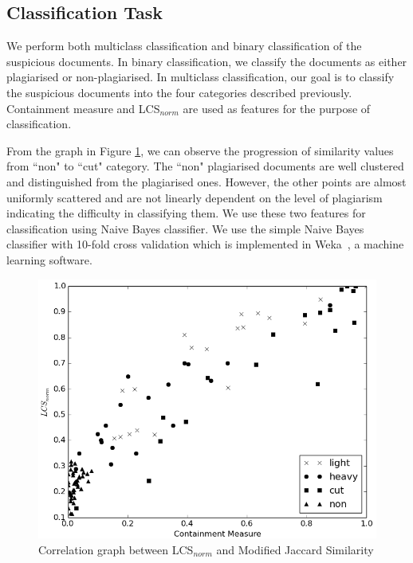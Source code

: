 \documentclass[11pt]{article}
\begin{document}
\subsection{Classification Task}
We perform both multiclass classification and binary classification of the suspicious documents. In binary classification, we classify the documents as either plagiarised or non-plagiarised. In multiclass classification, our goal is to classify the suspicious documents into the four categories described previously. Containment measure and LCS$_{norm}$ are used as features for the purpose of classification. 

From the graph in Figure \ref{graph}, we can observe the progression of similarity values from ``non" to ``cut" category. The ``non" plagiarised documents are well clustered and distinguished from the plagiarised ones. However, the other points are almost uniformly scattered and are not linearly dependent on the level of plagiarism indicating the difficulty in classifying them. We use these two features for classification using Naive Bayes classifier. We use the simple Naive Bayes classifier with 10-fold cross validation which is implemented in Weka~\cite{hall:09}, a machine learning software.
 
 \begin{figure}[h]
   \begin{center}
	\includegraphics[width=\columnwidth]{graph2.png}
     \caption{Correlation graph between LCS$_{norm}$ and Modified Jaccard Similarity}
   \label{graph}
   \end{center}
\end{figure}
\end{document}
